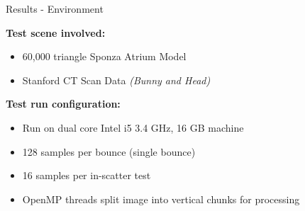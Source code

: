 \documentclass[10pt,compress,professionalfont]{beamer}
\begin{document}
\begin{frame}{Results - Environment}

    {\bf Test scene involved:}
    \begin{itemize}
        \item 60,000 triangle Sponza Atrium Model\\
        \vspace{2mm}
        \item Stanford CT Scan Data \textit{(Bunny and Head)}
        \vspace{2mm}
    \end{itemize}
    
    {\bf Test run configuration:}
    \begin{itemize}
        \item Run on dual core Intel i5 3.4 GHz, 16 GB machine\\
        \vspace{2mm}
        \item 128 samples per bounce (single bounce)\\
        \vspace{2mm}
        \item 16 samples per in-scatter test\\
        \vspace{2mm}
        \item OpenMP threads split image into vertical chunks for processing\\
    \end{itemize}
\end{frame}
\end{document}
